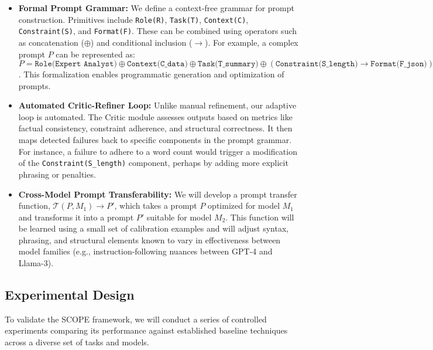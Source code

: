 \documentclass{article}
\begin{document}
\begin{itemize}
    \item \textbf{Formal Prompt Grammar:} We define a context-free grammar for prompt construction. Primitives include \texttt{Role(R)}, \texttt{Task(T)}, \texttt{Context(C)}, \texttt{Constraint(S)}, and \texttt{Format(F)}. These can be combined using operators such as concatenation ($\oplus$) and conditional inclusion ($\rightarrow$). For example, a complex prompt $P$ can be represented as:
    $P = \texttt{Role(Expert Analyst)} \oplus \texttt{Context(C\_data)} \oplus \texttt{Task(T\_summary)} \oplus (\texttt{Constraint(S\_length)} \rightarrow \texttt{Format(F\_json)})$.
    This formalization enables programmatic generation and optimization of prompts.

    \item \textbf{Automated Critic-Refiner Loop:} Unlike manual refinement, our adaptive loop is automated. The Critic module assesses outputs based on metrics like factual consistency, constraint adherence, and structural correctness. It then maps detected failures back to specific components in the prompt grammar. For instance, a failure to adhere to a word count would trigger a modification of the \texttt{Constraint(S\_length)} component, perhaps by adding more explicit phrasing or penalties.

    \item \textbf{Cross-Model Prompt Transferability:} We will develop a prompt transfer function, $\mathcal{T}(P, M_1) \rightarrow P'$, which takes a prompt $P$ optimized for model $M_1$ and transforms it into a prompt $P'$ suitable for model $M_2$. This function will be learned using a small set of calibration examples and will adjust syntax, phrasing, and structural elements known to vary in effectiveness between model families (e.g., instruction-following nuances between GPT-4 and Llama-3).
\end{itemize}

\subsection{Experimental Design}
To validate the SCOPE framework, we will conduct a series of controlled experiments comparing its performance against established baseline techniques across a diverse set of tasks and models.
\end{document}
